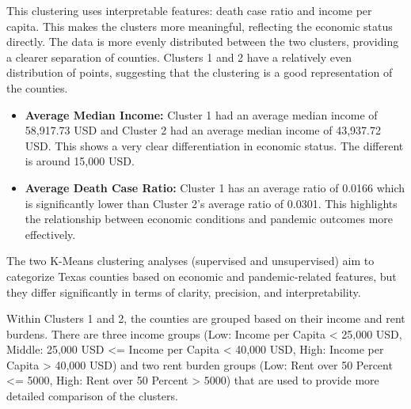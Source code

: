 \documentclass[
]{article}
\providecommand{\tightlist}{%
  \setlength{\itemsep}{0pt}\setlength{\parskip}{0pt}}
\begin{document}
\vspace{5pt}

This clustering uses interpretable features: death case ratio and income
per capita. This makes the clusters more meaningful, reflecting the
economic status directly. The data is more evenly distributed between
the two clusters, providing a clearer separation of counties. Clusters 1
and 2 have a relatively even distribution of points, suggesting that the
clustering is a good representation of the counties.

\vspace{5pt}

\begin{itemize}
\tightlist
\item
  \textbf{Average Median Income:} Cluster 1 had an average median income
  of 58,917.73 USD and Cluster 2 had an average median income of
  43,937.72 USD. This shows a very clear differentiation in economic
  status. The different is around 15,000 USD.
\item
  \textbf{Average Death Case Ratio:} Cluster 1 has an average ratio of
  0.0166 which is significantly lower than Cluster 2's average ratio of
  0.0301. This highlights the relationship between economic conditions
  and pandemic outcomes more effectively.
\end{itemize}

\vspace{5pt}

The two K-Means clustering analyses (supervised and unsupervised) aim to
categorize Texas counties based on economic and pandemic-related
features, but they differ significantly in terms of clarity, precision,
and interpretability.

\vspace{5pt}

Within Clusters 1 and 2, the counties are grouped based on their income
and rent burdens. There are three income groups (Low: Income per Capita
\textless{} 25,000 USD, Middle: 25,000 USD \textless= Income per Capita
\textless{} 40,000 USD, High: Income per Capita \textgreater{} 40,000
USD) and two rent burden groups (Low: Rent over 50 Percent \textless=
5000, High: Rent over 50 Percent \textgreater{} 5000) that are used to
provide more detailed comparison of the clusters.
\end{document}
